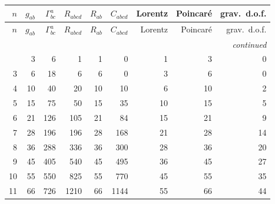 {\small\setlength{\tabcolsep}{5pt}
\begin{longtable}{@{}rrrrrrrrr@{}}
\toprule
$n$ & $g_{ab}$ & $\Gamma^a_{bc}$ & $R_{abcd}$ & $R_{ab}$ & $C_{abcd}$ & Lorentz & Poincar\'e & grav.\ d.o.f. \\
\midrule\endfirsthead
\toprule
$n$ & $g_{ab}$ & $\Gamma^a_{bc}$ & $R_{abcd}$ & $R_{ab}$ & $C_{abcd}$ & Lorentz & Poincar\'e & grav.\ d.o.f. \\
\midrule\endhead
\midrule\multicolumn{9}{r}{\emph{continued}}\\\endfoot
\bottomrule\endlastfoot
2 & 3 & 6 & 1 & 1 & 0 & 1 & 3 & 0 \\
3 & 6 & 18 & 6 & 6 & 0 & 3 & 6 & 0 \\
4 & 10 & 40 & 20 & 10 & 10 & 6 & 10 & 2 \\
5 & 15 & 75 & 50 & 15 & 35 & 10 & 15 & 5 \\
6 & 21 & 126 & 105 & 21 & 84 & 15 & 21 & 9 \\
7 & 28 & 196 & 196 & 28 & 168 & 21 & 28 & 14 \\
8 & 36 & 288 & 336 & 36 & 300 & 28 & 36 & 20 \\
9 & 45 & 405 & 540 & 45 & 495 & 36 & 45 & 27 \\
10 & 55 & 550 & 825 & 55 & 770 & 45 & 55 & 35 \\
11 & 66 & 726 & 1210 & 66 & 1144 & 55 & 66 & 44 \\
\end{longtable}}
